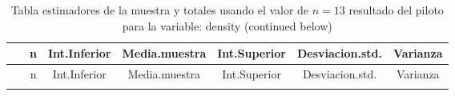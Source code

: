\documentclass[
]{article}
\begin{document}
\begin{longtable}[]{@{}ccccccc@{}}
\caption{Tabla estimadores de la muestra y totales usando el valor de
\(n = 13\) resultado del piloto para la variable: density (continued
below)}\tabularnewline
\toprule
\begin{minipage}[b]{0.20\columnwidth}\centering
~\strut
\end{minipage} & \begin{minipage}[b]{0.04\columnwidth}\centering
n\strut
\end{minipage} & \begin{minipage}[b]{0.11\columnwidth}\centering
Int.Inferior\strut
\end{minipage} & \begin{minipage}[b]{0.12\columnwidth}\centering
Media.muestra\strut
\end{minipage} & \begin{minipage}[b]{0.11\columnwidth}\centering
Int.Superior\strut
\end{minipage} & \begin{minipage}[b]{0.13\columnwidth}\centering
Desviacion.std.\strut
\end{minipage} & \begin{minipage}[b]{0.09\columnwidth}\centering
Varianza\strut
\end{minipage}\tabularnewline
\midrule
\endfirsthead
\toprule
\begin{minipage}[b]{0.20\columnwidth}\centering
~\strut
\end{minipage} & \begin{minipage}[b]{0.04\columnwidth}\centering
n\strut
\end{minipage} & \begin{minipage}[b]{0.11\columnwidth}\centering
Int.Inferior\strut
\end{minipage} & \begin{minipage}[b]{0.12\columnwidth}\centering
Media.muestra\strut
\end{minipage} & \begin{minipage}[b]{0.11\columnwidth}\centering
Int.Superior\strut
\end{minipage} & \begin{minipage}[b]{0.13\columnwidth}\centering
Desviacion.std.\strut
\end{minipage} & \begin{minipage}[b]{0.09\columnwidth}\centering
Varianza\strut
\end{minipage}\tabularnewline
\midrule
\endhead
\begin{minipage}[t]{0.20\columnwidth}\centering

\end{minipage}
\end{longtable}
\end{document}
